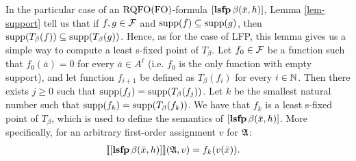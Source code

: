 In the particular case of an ${\rm RQFO}({\rm FO})$-formula $[{\bf lsfp} \, \beta(\bar{x}, h)]$, Lemma  \ref{lem-support} tell us that if $f,g \in \mathcal{F}$ and $\text{\rm supp}(f) \subseteq \text{\rm supp}(g)$, then $\text{\rm supp}(T_\beta(f)) \subseteq \text{\rm supp}(T_\beta(g))$. Hence, as for the case of LFP, this lemma gives us a simple way to compute a least s-fixed point of $T_\beta$. Let $f_0 \in \mathcal{F}$ be a function such that $f_0(\bar a) = 0$ for every $\bar a \in A^\ell$ (i.e. $f_0$ is the only function with empty support), and let function $f_{i+1}$ be defined as $T_\beta(f_i)$ for every $i \in \mathbb{N}$. Then there exists $j \geq 0$ such that $\text{\rm supp}(f_j) = \text{\rm supp}(T_\beta(f_j))$. Let $k$ be the smallest natural number such that $\text{\rm supp}(f_{k}) = \text{\rm supp}(T_\beta(f_k))$. We have that $f_k$ is a least s-fixed point of $T_\beta$, which is used to define the semantics of $[{\bf lsfp} \, \beta(\bar{x}, h)]$. More specifically, for an arbitrary first-order assignment $v$ for $\mathfrak{A}$:
\begin{align*}
{\llbracket{}{[{\bf lsfp} \, \beta(\bar{x}, h)]}\rrbracket}(\mathfrak{A},v) &= f_{k}(v(\bar{x})).
\end{align*}

